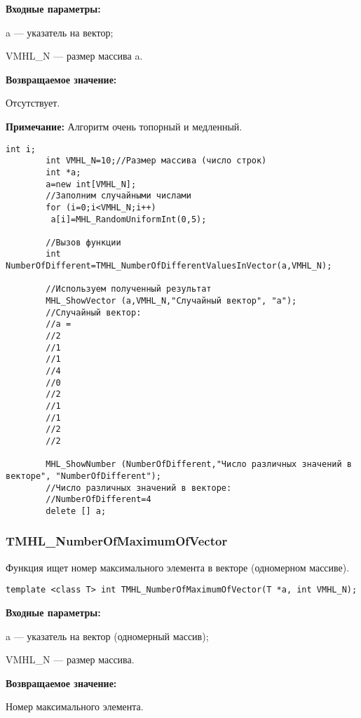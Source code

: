 \documentclass[a4paper,12pt]{article}
\begin{document}
\textbf{Входные параметры:}  
 
a --- указатель на вектор;
 
VMHL\_N --- размер массива a.

\textbf{Возвращаемое значение:}

Отсутствует.

\textbf{Примечание:}
 Алгоритм очень топорный и медленный.


\begin{lstlisting}[label=code_use_TMHL_NumberOfDifferentValuesInVector,caption=Пример использования]
        int i;
        int VMHL_N=10;//Размер массива (число строк)
        int *a;
        a=new int[VMHL_N];
        //Заполним случайными числами
        for (i=0;i<VMHL_N;i++)
         a[i]=MHL_RandomUniformInt(0,5);

        //Вызов функции
        int NumberOfDifferent=TMHL_NumberOfDifferentValuesInVector(a,VMHL_N);

        //Используем полученный результат
        MHL_ShowVector (a,VMHL_N,"Случайный вектор", "a");
        //Случайный вектор:
        //a =
        //2
        //1
        //1
        //4
        //0
        //2
        //1
        //1
        //2
        //2

        MHL_ShowNumber (NumberOfDifferent,"Число различных значений в векторе", "NumberOfDifferent");
        //Число различных значений в векторе:
        //NumberOfDifferent=4
        delete [] a;
\end{lstlisting}

\subsubsection{TMHL\_NumberOfMaximumOfVector}\label{TMHL_NumberOfMaximumOfVector}

Функция ищет номер максимального элемента в векторе (одномерном массиве).


\begin{lstlisting}[label=code_syntax_TMHL_NumberOfMaximumOfVector,caption=Синтаксис]
template <class T> int TMHL_NumberOfMaximumOfVector(T *a, int VMHL_N);
\end{lstlisting}

\textbf{Входные параметры:}

 a --- указатель на вектор (одномерный массив);
 
 VMHL\_N --- размер массива.

\textbf{Возвращаемое значение:}

Номер максимального элемента.
\end{document}
